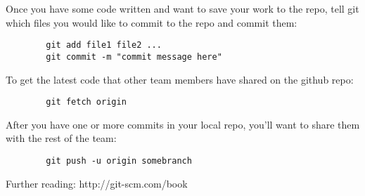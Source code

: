 \documentclass{article}
\begin{document}
	Once you have some code written and want to save your work to the repo, tell git which files you would like to commit to the repo and commit them:
	
	\begin{minipage}{0.95\textwidth}\begin{lstlisting}
	    git add file1 file2 ...
	    git commit -m "commit message here"
	\end{lstlisting}\end{minipage}

	To get the latest code that other team members have shared on the github repo:

	\begin{minipage}{0.95\textwidth}\begin{lstlisting}
	    git fetch origin
	\end{lstlisting}\end{minipage}

	After you have one or more commits in your local repo, you'll want to share them with the rest of the team:

	\begin{minipage}{0.95\textwidth}\begin{lstlisting}
	    git push -u origin somebranch
	\end{lstlisting}\end{minipage}

	Further reading: http://git-scm.com/book
\end{document}
